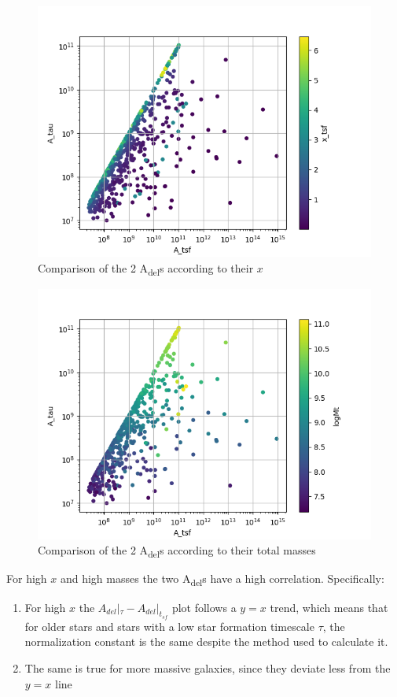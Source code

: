 \documentclass[a4paper,twocolumn]{article}
\begin{document}
\begin{figure}[htbp]
\centering
\includegraphics[width=.9\linewidth]{./figs/A_tau-A_tsf_colo_X.png}
\caption{\label{fig:Comparison of the 2 A_{del}s according to their $x$}Comparison of the 2 A\textsubscript{del}s according to their \(x\)}
\end{figure}
\begin{figure}[htbp]
\centering
\includegraphics[width=.9\linewidth]{./figs/A_tau-A_tsf_Mt.png}
\caption{\label{fig:Comparison of the 2 A_{del}s according to their total masses}Comparison of the 2 A\textsubscript{del}s according to their total masses}
\end{figure}

For high \(x\) and high masses the two A\textsubscript{del}s have a high correlation. Specifically:
\begin{enumerate}
\item For high \(x\) the \(A_{del}|_{\tau}-A_{del}|_{t_{sf}}\) plot follows a \(y=x\) trend, which means that for older stars and stars with a low star formation timescale \(\tau\), the normalization constant is the same despite the method used to calculate it.
\item The same is true for more massive galaxies, since they deviate less from the \(y=x\) line
\end{enumerate}
\end{document}
